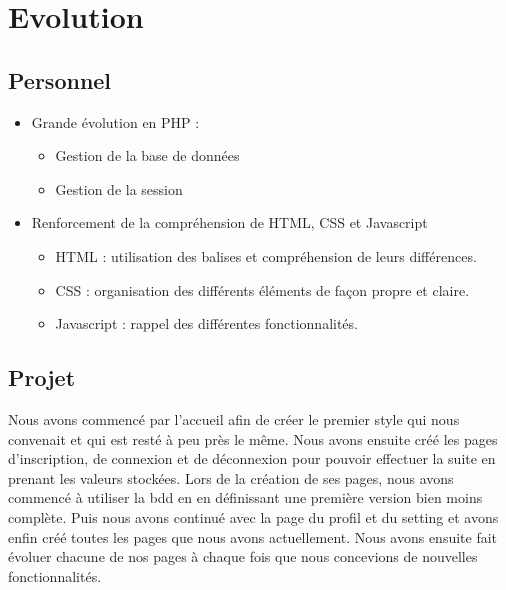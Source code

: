 \documentclass[12pt,a4paper]{article}
\begin{document}
\section{Evolution}
\subsection{Personnel}

\begin{itemize}
    
  \item Grande évolution en PHP :
    \begin{itemize}
        
    \item Gestion de la base de données
    \item Gestion de la session
      
    \end{itemize}
    
  \item Renforcement de la compréhension de HTML, CSS et Javascript
    \begin{itemize}
        
    \item HTML : utilisation des balises et compréhension de leurs différences.
    \item CSS : organisation des différents éléments de façon propre et claire.
    \item Javascript : rappel des différentes fonctionnalités.
      
    \end{itemize}
  
\end{itemize}

\newpage

\subsection{Projet}

Nous avons commencé par l'accueil afin de créer le premier style qui nous convenait et qui est resté à peu près le même.
Nous avons ensuite créé les pages d'inscription, de connexion et de déconnexion pour pouvoir effectuer la suite en prenant les valeurs stockées. Lors de la création de ses pages, nous avons commencé à utiliser la bdd en en définissant une première version bien moins complète.
Puis nous avons continué avec la page du profil et du setting et avons enfin créé toutes les pages que nous avons actuellement. Nous avons ensuite fait évoluer chacune de nos pages à chaque fois que nous concevions de nouvelles fonctionnalités.
\end{document}
